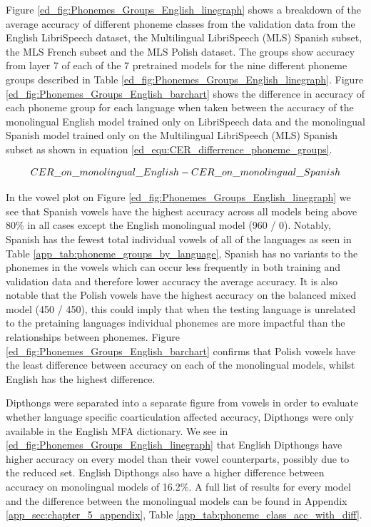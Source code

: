 \begin{table}
Figure \ref{ed_fig:Phonemes_Groups_English_linegraph} shows a breakdown of the average accuracy of different phoneme classes from the validation data from the English LibriSpeech dataset, the Multilingual LibriSpeech (MLS) Spanish subset, the MLS French subset and the MLS Polish dataset. The groups show accuracy from layer 7 of each of the 7 pretrained models for the nine different phoneme groups described in Table \ref{ed_fig:Phonemes_Groups_English_linegraph}. Figure \ref{ed_fig:Phonemes_Groups_English_barchart} shows the difference in accuracy of each phoneme group for each language when taken between the accuracy of the monolingual English model trained only on LibriSpeech data and the monolingual Spanish model trained only on the Multilingual LibriSpeech (MLS) Spanish subset as shown in equation \ref{ed_equ:CER_differrence_phoneme_groups}.

\begin{equation}\label{ed_equ:CER_differrence_phoneme_groups}
\centering
    CER\_on\_monolingual\_English - CER\_on\_monolingual\_Spanish
\end{equation}

In the vowel plot on Figure \ref{ed_fig:Phonemes_Groups_English_linegraph} we see that Spanish vowels have the highest accuracy across all models being above 80\% in all cases except the English monolingual model (960 / 0). Notably, Spanish has the fewest total individual vowels of all of the languages as seen in Table \ref{app_tab:phoneme_groups_by_language}, Spanish has no variants to the phonemes in the vowels which can occur less frequently in both training and validation data and therefore lower accuracy the average accuracy. It is also notable that the Polish vowels have the highest accuracy on the balanced mixed model (450 / 450), this could imply that when the testing language is unrelated to the pretaining languages individual phonemes are more impactful than the relationships between phonemes. Figure \ref{ed_fig:Phonemes_Groups_English_barchart} confirms that Polish vowels have the least difference between accuracy on each of the monolingual models, whilst English has the highest difference. 

Dipthongs were separated into a separate figure from vowels in order to evaluate whether language specific coarticulation affected accuracy, Dipthongs were only available in the English MFA dictionary. We see in \ref{ed_fig:Phonemes_Groups_English_linegraph} that English Dipthongs have higher accuracy on every model than their vowel counterparts, possibly due to the reduced set. English Dipthongs also have a higher difference between accuracy on monolingual models of 16.2\%. A full list of results for every model and the difference between the monolingual models can be found in Appendix \ref{app_sec:chapter_5_appendix}, Table \ref{app_tab:phoneme_class_acc_with_diff}.


\end{table}
